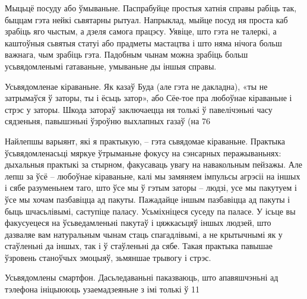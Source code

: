 Мыцьцё посуду або ўмываньне. Паспрабуйце простыя хатнія справы рабіць так, быццам гэта нейкі сьвятарны рытуал. Напрыклад, мыйце посуд ня проста каб зрабіць яго чыстым, а дзеля самога працэсу. Уявіце, што гэта не талеркі, а каштоўныя сьвятыя статуі або прадметы мастацтва і што няма нічога больш важнага, чым зрабіць гэта. Падобным чынам можна зрабіць больш усьвядомленымі гатаваньне, умываньне ды іншыя справы.

Усьвядомленае кіраваньне. Як казаў Буда (але гэта не дакладна), «ты не затрымаўся ў заторы, ты і ёсьць затор», або Сёе-тое пра любоўнае кіраваньне і стрэс у заторы. Шкода затораў заключаецца ня толькі ў павелічэньні часу сядзеньня, павышэньні ўзроўню выхлапных газаў (на 76%

Найлепшы варыянт, які я практыкую, – гэта сьвядомае кіраваньне. Практыка ўсьвядомленасьці мяркуе ўтрыманьне фокусу на сэнсарных перажываньнях: дыхальныя практыкі за стырном, факусаваць увагу на навакольным пейзажы. Але лепш за ўсё – любоўнае кіраваньне, калі мы замяняем імпульсы агрэсіі на іншых і сябе разуменьнем таго, што ўсе мы ў гэтым заторы – людзі, усе мы пакутуем і ўсе мы хочам пазбавіцца ад пакуты. Пажадайце іншым пазбавіцца ад пакуты і быць шчасьлівымі, саступіце паласу. Усьміхніцеся суседу па паласе. У ісьце вы факусуецеся на ўсьведамленьні пакутаў і цяжкасьцяў іншых людзей, што дазваляе вам натуральным чынам стаць спагадлівымі, а не крытычнымі як у стаўленьні да іншых, так і ў стаўленьні да сябе. Такая практыка павышае ўзровень станоўчых эмоцыяў, зьмяншае трывогу і стрэс.

Усьвядомлены смартфон. Дасьледаваньні паказваюць, што апавяшчэньні ад тэлефона ініцыююць узаемадзеяньне з імі толькі ў 11%

